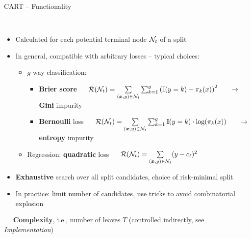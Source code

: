 \begin{frame}{CART -- Functionality}

\footnotesize

 \\

\begin{itemize}
  \item Calculated for each potential terminal node $\mathcal{N}_t$
  of a split
  \item In general, compatible with arbitrary losses -- typical choices:
  \begin{itemize}
    \footnotesize
    \item $g$-way classification:
    \begin{itemize}
      \footnotesize
      \item \textbf{Brier score} ~~
      $\mathcal{R}(\mathcal{N}_t) = \sum\limits_{(\bm{x},y) \in \mathcal{N}_t} \sum_{k=1}^g \left( \mathbb{I}(y = k)
      - \pi_k(x) \right)^2$ ~~ $\rightarrow$ \textbf{Gini} impurity
      \item \textbf{Bernoulli} loss ~~
      $\mathcal{R}(\mathcal{N}_t) = \sum\limits_{(\bm{x},y) \in \mathcal{N}_t} \sum_{k=1}^g \mathbb{I}(y = k) \cdot
      \log(\pi_k(x))$ ~~ $\rightarrow$ \textbf{entropy} impurity
    \end{itemize}
    \item Regression: \textbf{quadratic} loss ~~
    $\mathcal{R}(\mathcal{N}_t) = \sum\limits_{(\bm{x},y) \in \mathcal{N}_t} (y - c_t)^2$
  \end{itemize}
\end{itemize}

\medskip


\begin{itemize}
  \item \textbf{Exhaustive} search over all split candidates, choice of 
  risk-minimal split
  \item In practice: limit number of candidates, use tricks to avoid 
  combinatorial explosion
\end{itemize}

\medskip

 ~~ \textbf{Complexity}, i.e., 
number of leaves $T$ (controlled indirectly, see \textit{Implementation}) 

\end{frame}


